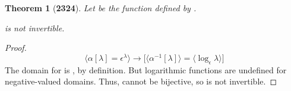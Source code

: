 \documentclass[preview]{standalone}
\newtheorem{theorem}{Theorem}
\begin{document}
\begin{theorem}[\textbf{2324}]
    Let \bm{$\alpha$} be the function 
    defined by \bm{$\alpha[\lambda] = \epsilon ^\lambda$}. 
    \begin{center}
        \bm{$\alpha[\lambda]$} is not invertible.
    \end{center}
\end{theorem}

\begin{proof}
    \begin{equation*}
        \Big \langle \alpha[\lambda] = \epsilon ^\lambda \Big \rangle
            \rightarrow
        \bigg[
            \Big \langle \alpha ^{-1}[\lambda] \Big \rangle 
                =
            \Big \langle \log_{\epsilon} \lambda \Big \rangle
        \bigg]
    \end{equation*}
    The domain for  is , by definition. 
    But logarithmic functions are undefined for negative-valued domains.
    Thus, \bm{$\alpha[\lambda]$} cannot be bijective, 
    so \bm{$\alpha[\lambda]$} is not invertible.
\end{proof}
\end{document}
